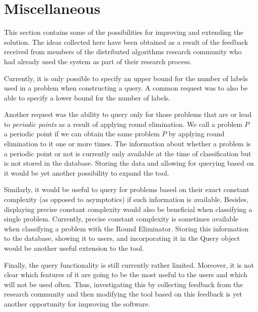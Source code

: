 \section{Miscellaneous}

This section contains some of the possibilities
for improving and extending the solution. The ideas collected
here have been obtained as a result of the feedback
received from members of the distributed algorithms
research community who had already used the system
as part of their research process.

Currently, it is only possible to specify an upper bound for
the number of labels used in a problem when constructing a query.
A common request was to also be able to specify a lower bound for the
number of labels.

Another request was the ability to query only for those problems that are
or lead to \emph{periodic points} as a result of applying round elimination.
We call a problem $P$ a periodic point if we can obtain
the same problem $P$ by applying round elimination to it one or more
times.
The information about whether a problem is a periodic point or not
is currently only available at the time of classification but is
not stored in the database. Storing the data and allowing for
querying based on it would be yet another possibility to expand the tool.

Similarly, it would be useful to query for problems based on their
exact constant complexity (as opposed to asymptotics) if such
information is available. Besides, displaying precise constant complexity
would also be beneficial when classifying a single problem.
Currently, precise constant complexity is sometimes available when
classifying a problem with the Round Eliminator. Storing this
information to the database, showing it to users, and incorporating it
in the Query object would be another useful extension to the tool.

Finally, the query functionality is still currently rather limited.
Moreover, it is not clear which features of it are going to be the
most useful to the users and which will not be used often.
Thus, investigating this by collecting feedback from the
research community and then modifying the tool based on
this feedback is yet another opportunity for improving the software.

